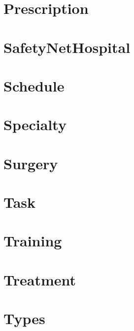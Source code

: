 \documentclass{article}
\begin{document}
\section{Prescription}

\section{SafetyNetHospital}

\section{Schedule}

\section{Specialty}

\section{Surgery}

\section{Task}

\section{Training}

\section{Treatment}

\section{Types}

\end{document}
